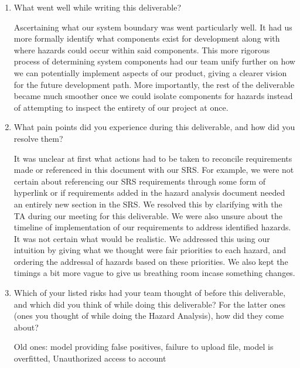 \documentclass{article}
\begin{document}



\begin{enumerate}
    \item What went well while writing this deliverable?

    Ascertaining what our system boundary was went particularly well. It had 
    us more formally identify what components exist for development along 
    with where hazards could occur within said components. This more rigorous
    process of determining system components had our team unify further on
    how we can potentially implement aspects of our product, giving a clearer
    vision for the future development path. More importantly, the rest of the 
    deliverable became much smoother once we could isolate components
    for hazards instead of attempting to inspect the entirety of our project 
    at once.

    \item What pain points did you experience during this deliverable, and how
    did you resolve them?

    It was unclear at first what actions had to be taken to reconcile 
    requirements made or referenced in this document with our SRS. For example, 
    we were not certain about referencing our SRS requirements through some 
    form of hyperlink or if requirements added in the hazard analysis document 
    needed an entirely new section in the SRS. We resolved this by clarifying 
    with the TA during our meeting for this deliverable. We were also unsure 
    about the timeline of implementation of our requirements to address 
    identified hazards. It was not certain what would be realistic. We 
    addressed this using our intuition by giving what we thought were fair 
    priorities to each hazard, and ordering the addressal of hazards based on 
    these priorities. We also kept the timings a bit more vague to give us 
    breathing room incase something changes.

    \item Which of your listed risks had your team thought of before this
    deliverable, and which did you think of while doing this deliverable? For
    the latter ones (ones you thought of while doing the Hazard Analysis), how
    did they come about?
    
    Old ones: model providing false positives, failure to upload file, 
    model is overfitted, Unauthorized access to account


\end{enumerate}
\end{document}
